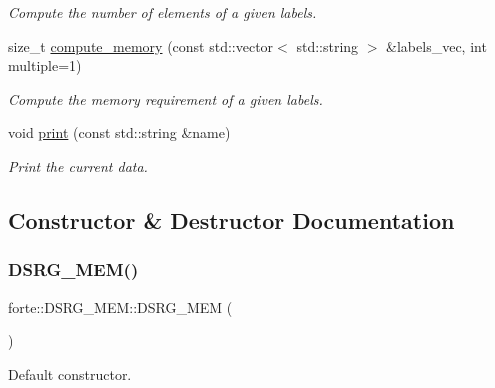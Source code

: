 \begin{DoxyCompactItemize}
\begin{DoxyCompactList}\small\item\em Compute the number of elements of a given labels. \end{DoxyCompactList}\item 
size\+\_\+t \mbox{\hyperlink{classforte_1_1_d_s_r_g___m_e_m_a43e1ba53bcac873bcec050cf7676751d}{compute\+\_\+memory}} (const std\+::vector$<$ std\+::string $>$ \&labels\+\_\+vec, int multiple=1)
\begin{DoxyCompactList}\small\item\em Compute the memory requirement of a given labels. \end{DoxyCompactList}\item 
void \mbox{\hyperlink{classforte_1_1_d_s_r_g___m_e_m_a676b78c5a39feea83a2fdaafe87a5e78}{print}} (const std\+::string \&name)
\begin{DoxyCompactList}\small\item\em Print the current data. \end{DoxyCompactList}\end{DoxyCompactItemize}


\subsection{Constructor \& Destructor Documentation}
\mbox{\label{classforte_1_1_d_s_r_g___m_e_m_a7889ef1265286f9e83d4f2e57f2d0184}} 
\subsubsection{\texorpdfstring{D\+S\+R\+G\+\_\+\+M\+E\+M()}{DSRG\_MEM()}\hspace{0.1cm}{\footnotesize\ttfamily [1/2]}}
{\footnotesize\ttfamily forte\+::\+D\+S\+R\+G\+\_\+\+M\+E\+M\+::\+D\+S\+R\+G\+\_\+\+M\+EM (\begin{DoxyParamCaption}{ }\end{DoxyParamCaption})}



Default constructor. 

\mbox{\label{classforte_1_1_d_s_r_g___m_e_m_aca48bd076cfd1e92573821a857b76e54}} 
